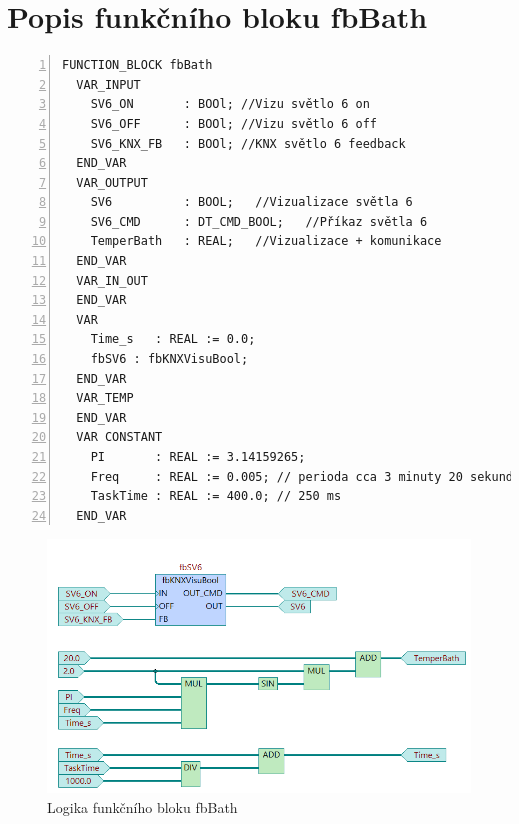 \chapter{Popis funkčního bloku fbBath}
\label{apend:fbBath}
\begin{lstlisting}[language=ST, breaklines=true, numbers=left, numberstyle=\small, numbersep=10pt, frame=single, basicstyle=\ttfamily\small, caption={Definice funkčního bloku fbBath}, label={lst:fbBath}]
  FUNCTION_BLOCK fbBath
  VAR_INPUT
    SV6_ON       : BOOl; //Vizu světlo 6 on
    SV6_OFF      : BOOl; //Vizu světlo 6 off
    SV6_KNX_FB   : BOOl; //KNX světlo 6 feedback
  END_VAR
  VAR_OUTPUT
    SV6          : BOOL;   //Vizualizace světla 6
    SV6_CMD      : DT_CMD_BOOL;   //Příkaz světla 6
    TemperBath   : REAL;   //Vizualizace + komunikace
  END_VAR
  VAR_IN_OUT
  END_VAR
  VAR
    Time_s   : REAL := 0.0;
    fbSV6 : fbKNXVisuBool;
  END_VAR
  VAR_TEMP
  END_VAR
  VAR CONSTANT
    PI       : REAL := 3.14159265;
    Freq     : REAL := 0.005; // perioda cca 3 minuty 20 sekund
    TaskTime : REAL := 400.0; // 250 ms
  END_VAR
\end{lstlisting}
\begin{figure}[!ht]
  \begin{center}
  \includegraphics[scale=0.7]{obrazky/fbBath.png}
  \end{center}
  \caption[Logika funkčního bloku fbBath]{Logika funkčního bloku fbBath}
  \label{fig:fbBath}
\end{figure}
\pagebreak
\newpage
